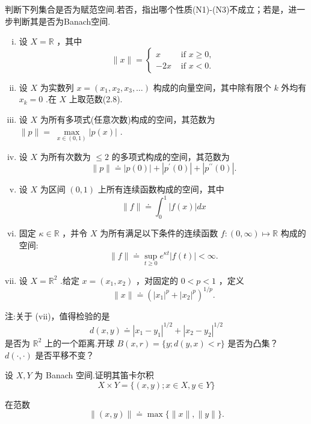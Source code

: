 \begin{rbhw}[index=1]
判断下列集合是否为赋范空间.若否，指出哪个性质(N1)-(N3)不成立；若是，进一步判断其是否为Banach空间.
\begin{enumerate}[(i)]
    \item 设 $X = \mathbb{R}$ ，其中
\[
\| x\|  = \begin{cases} x & \text{ if }x \geq  0, \\   - {2x} & \text{ if }x < 0. \end{cases}
\]
    \item 设 $X$ 为实数列 $x = \left( {{x}_{1},{x}_{2},{x}_{3},\ldots }\right)$ 构成的向量空间，其中除有限个 $k$ 外均有 ${x}_{k} = 0$ .在 $X$ 上取范数(2.8).
    \item 设 $X$ 为所有多项式(任意次数)构成的空间，其范数为 $\| p\|  = \; \mathop{\max }\limits_{{x \in  \left(  {0,1}\right)  }}\left| {p\left( x\right) }\right|$ .
    \item 设 $X$ 为所有次数为 $\leq  2$ 的多项式构成的空间，其范数为\[
\| p\|  \doteq  \left| {p\left( 0\right) }\right|  + \left| {{p}^{\prime }\left( 0\right) }\right|  + \left| {{p}^{\prime \prime }\left( 0\right) }\right| .
\]
    \item 设 $X$ 为区间 $\left(  {0,1}\right)$ 上所有连续函数构成的空间，其中\[
        \| f\|  \doteq  {\int }_{0}^{1}\left| {f\left( x\right) }\right| {dx}
    \]
    \item 固定 $\kappa  \in  \mathbb{R}$ ，并令 $X$ 为所有满足以下条件的连续函数 $f : ( 0,\infty )  \mapsto  \mathbb{R}$ 构成的空间:
    \[
        \| f\|  \doteq  \mathop{\sup }\limits_{{t \geq  0}}{e}^{\kappa t}\left| {f\left( t\right) }\right|  < \infty .
    \]
    \item 设 $X = {\mathbb{R}}^{2}$ .给定 $x = \left( {{x}_{1},{x}_{2}}\right)$ ，对固定的 $0 < p < 1$ ，定义
\[
\| x\|  \doteq  {\left( {\left| {x}_{1}\right| }^{p} + {\left| {x}_{2}\right| }^{p}\right) }^{1/p}.
\]
\end{enumerate}
注:关于 (vii)，值得检验的是
\[
d\left( {x,y}\right)  \doteq  {\left| {x}_{1} - {y}_{1}\right| }^{1/2} + {\left| {x}_{2} - {y}_{2}\right| }^{1/2}
\]
是否为 ${\mathbb{R}}^{2}$ 上的一个距离.开球 $B\left( {x,r}\right)  = \{ y;d\left( {y,x}\right)  < r\}$ 是否为凸集？ $d\left( {\cdot , \cdot  }\right)$ 是否平移不变？
\end{rbhw}

\begin{rbhw}
设 $X,Y$ 为 Banach 空间.证明其笛卡尔积
\[
X \times  Y = \{ \left( {x,y}\right) ;x \in  X,y \in  Y\}
\]

在范数
\begin{equation}\tag{2.41}
\| \left( {x,y}\right) \|  \doteq  \max \{ \| x\| ,\| y\| \} .
\end{equation}
\end{rbhw}

